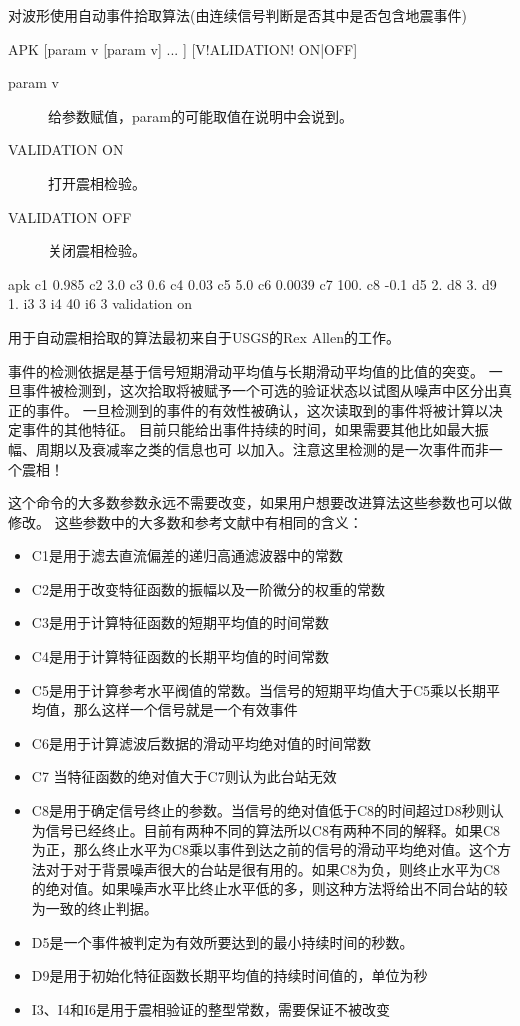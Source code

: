 \label{cmd:apk}

对波形使用自动事件拾取算法(由连续信号判断是否其中是否包含地震事件)

\begin{SACSTX}
APK [param v [param v] ... ] [V!ALIDATION! ON|OFF]
\end{SACSTX}

\begin{description}
\item [param v] 给参数赋值，param的可能取值在说明中会说到。
\item [VALIDATION ON] 打开震相检验。
\item [VALIDATION OFF] 关闭震相检验。
\end{description}

\begin{SACDFT}
apk c1 0.985 c2 3.0 c3 0.6 c4 0.03 c5 5.0 c6 0.0039 c7 100. c8 -0.1
    d5 2. d8 3. d9 1. i3 3 i4 40 i6 3 validation on
\end{SACDFT}

用于自动震相拾取的算法最初来自于USGS的Rex Allen的工作。

事件的检测依据是基于信号短期滑动平均值与长期滑动平均值的比值的突变。
一旦事件被检测到，这次拾取将被赋予一个可选的验证状态以试图从噪声中区分出真正的事件。
一旦检测到的事件的有效性被确认，这次读取到的事件将被计算以决定事件的其他特征。
目前只能给出事件持续的时间，如果需要其他比如最大振幅、周期以及衰减率之类的信息也可
以加入。注意这里检测的是一次事件而非一个震相！

这个命令的大多数参数永远不需要改变，如果用户想要改进算法这些参数也可以做修改。
这些参数中的大多数和参考文献中有相同的含义：
\begin{itemize}
\item C1是用于滤去直流偏差的递归高通滤波器中的常数
\item C2是用于改变特征函数的振幅以及一阶微分的权重的常数
\item C3是用于计算特征函数的短期平均值的时间常数
\item C4是用于计算特征函数的长期平均值的时间常数
\item C5是用于计算参考水平阀值的常数。当信号的短期平均值大于C5乘以长期平均值，那么这样一个信号就是一个有效事件
\item C6是用于计算滤波后数据的滑动平均绝对值的时间常数
\item C7 当特征函数的绝对值大于C7则认为此台站无效
\item C8是用于确定信号终止的参数。当信号的绝对值低于C8的时间超过D8秒则认为信号已经终止。目前有两种不同的算法所以C8有两种不同的解释。如果C8为正，那么终止水平为C8乘以事件到达之前的信号的滑动平均绝对值。这个方法对于对于背景噪声很大的台站是很有用的。如果C8为负，则终止水平为C8的绝对值。如果噪声水平比终止水平低的多，则这种方法将给出不同台站的较为一致的终止判据。
\item D5是一个事件被判定为有效所要达到的最小持续时间的秒数。
\item D9是用于初始化特征函数长期平均值的持续时间值的，单位为秒
\item I3、I4和I6是用于震相验证的整型常数，需要保证不被改变
\end{itemize}

